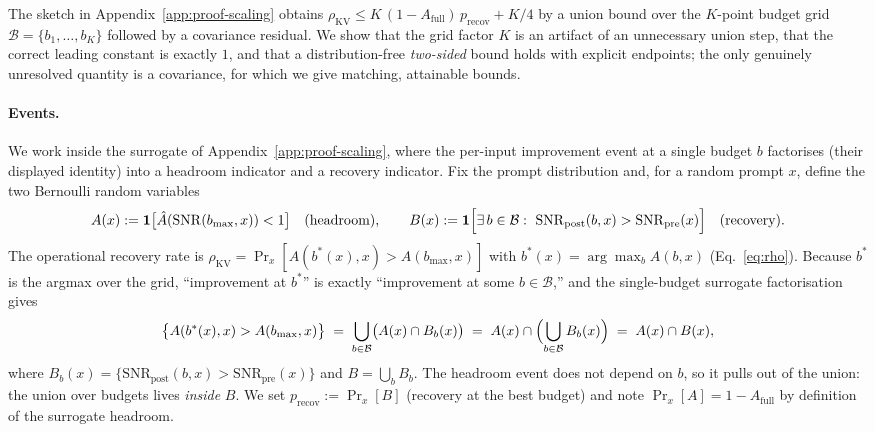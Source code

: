 The sketch in Appendix~\ref{app:proof-scaling} obtains
$\rho_{\mathrm{KV}} \le K\,(1-A_{\mathrm{full}})\,p_{\mathrm{recov}} + K/4$
by a union bound over the $K$-point budget grid $\mathcal{B}=\{b_1,\dots,b_K\}$
followed by a covariance residual. We show that the grid factor $K$ is an
artifact of an unnecessary union step, that the correct leading constant is
exactly $1$, and that a distribution-free \emph{two-sided} bound holds with
explicit endpoints; the only genuinely unresolved quantity is a covariance,
for which we give matching, attainable bounds.

\paragraph{Events.} We work inside the surrogate of
Appendix~\ref{app:proof-scaling}, where the per-input improvement event at a
single budget $b$ factorises (their displayed identity) into a headroom
indicator and a recovery indicator. Fix the prompt distribution and, for a
random prompt $x$, define the two Bernoulli random variables
\begin{equation}
\label{eq:AB-def}
A(x) := \mathbf{1}\bigl[\hat A(\mathrm{SNR}(b_{\max},x)) < 1\bigr]
\quad\text{(headroom)},
\qquad
B(x) := \mathbf{1}\Bigl[\exists\, b\in\mathcal{B}:\ \mathrm{SNR}_{\mathrm{post}}(b,x) > \mathrm{SNR}_{\mathrm{pre}}(x)\Bigr]
\quad\text{(recovery)} .
\end{equation}
The operational recovery rate is $\rho_{\mathrm{KV}} = \Pr_x[A(b^*(x),x) > A(b_{\max},x)]$
with $b^*(x)=\arg\max_b A(b,x)$ (Eq.~\eqref{eq:rho}). Because $b^*$ is the
argmax over the grid, ``improvement at $b^*$'' is exactly ``improvement at some
$b\in\mathcal{B}$,'' and the single-budget surrogate factorisation gives
\begin{equation}
\label{eq:AandB}
\bigl\{A(b^*(x),x) > A(b_{\max},x)\bigr\}
\;=\; \bigcup_{b\in\mathcal{B}}\bigl(A(x)\cap B_b(x)\bigr)
\;=\; A(x)\cap\Bigl(\bigcup_{b\in\mathcal{B}}B_b(x)\Bigr)
\;=\; A(x)\cap B(x),
\end{equation}
where $B_b(x)=\{\mathrm{SNR}_{\mathrm{post}}(b,x)>\mathrm{SNR}_{\mathrm{pre}}(x)\}$
and $B=\bigcup_b B_b$. The headroom event does not depend on $b$, so it pulls
out of the union: the union over budgets lives \emph{inside} $B$. We set
$p_{\mathrm{recov}} := \Pr_x[B]$ (recovery at the best budget) and note
$\Pr_x[A] = 1-A_{\mathrm{full}}$ by definition of the surrogate headroom.

